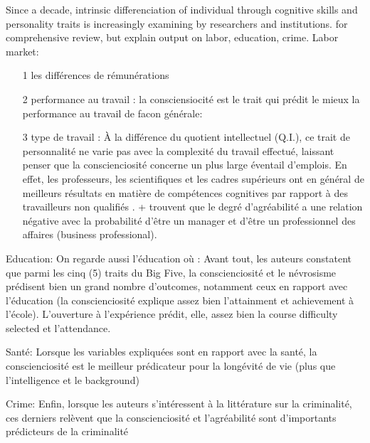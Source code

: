 \documentclass[a4paper, 11pt, onecolumn]{article}
\begin{document}
Since a decade, intrinsic differenciation of individual through cognitive skills and personality traits is increasingly examining by researchers and institutions. 
\cite{Almlund2011} for comprehensive review, but explain output on labor, education, crime.
Labor market:
\begin{itemize}
\item[1] les différences de rémunérations \citep{Bowles2001} \citep{Heckman2006}  \citep{Cawley2001}
\item[2] performance au travail : la consciensiocité est le trait qui prédit le mieux la performance au travail de facon générale: \citep{Nyhus2005} \citep{Salgado1997} \citep{Hogan2003} \citep{Barrick1991}
\item[3] type de travail : À la différence du quotient intellectuel (Q.I.), ce trait de personnalité ne varie pas avec la complexité du travail effectué, laissant penser que la conscienciosité concerne un plus large éventail d’emplois. En effet, les professeurs, les scientifiques et les cadres supérieurs ont en général de meilleurs résultats en matière de compétences cognitives par rapport à des travailleurs non qualifiés \citep{Schmidt2004} \citep{Almlund2011} \citep{Barrick1991}. + \citep{CobbClark2011} trouvent que le degré d’agréabilité a une relation négative avec la probabilité d’être un manager et d’être un professionnel des affaires (business professional).
\end{itemize}

Education: On regarde aussi l'éducation où \cite{Almlund2011} : Avant tout, les auteurs constatent que parmi les cinq (5) traits du Big Five, la conscienciosité et le névrosisme prédisent bien un grand nombre d’outcomes, notamment ceux en rapport avec l’éducation (la conscienciosité explique assez bien l’attainment et achievement à l’école). L’ouverture à l’expérience prédit, elle, assez bien la course difficulty selected et l’attendance.

Santé: Lorsque les variables expliquées sont en rapport avec la santé, la conscienciosité est le meilleur prédicateur pour la longévité de vie (plus que l’intelligence et le background) \citep{Almlund2011}

Crime: Enfin, lorsque les auteurs s’intéressent à la littérature sur la criminalité, ces derniers relèvent que la conscienciosité et l’agréabilité sont d’importants prédicteurs de la criminalité \citep{Almlund2011} 
\end{document}
